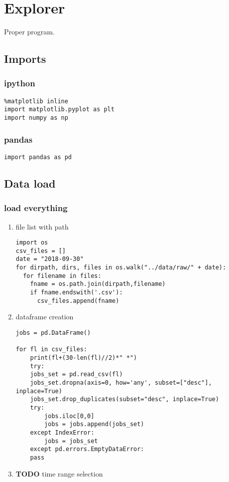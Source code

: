 \documentclass[11pt]{article}
\author{teddd}
\date{\today}
\title{}
\begin{document}
\tableofcontents

\section{Explorer}
\label{sec:org60d7d67}
Proper program.
\subsection{Imports}
\label{sec:org68087d8}
\subsubsection{ipython}
\label{sec:orgb3733d1}
\begin{verbatim}
%matplotlib inline
import matplotlib.pyplot as plt
import numpy as np
\end{verbatim}
\subsubsection{pandas}
\label{sec:orgf814322}
\begin{verbatim}
import pandas as pd    
\end{verbatim}

\subsection{Data load}
\label{sec:org42a236d}
\subsubsection{load everything}
\label{sec:org2d6df79}
\begin{enumerate}
\item file list with path
\label{sec:org4930762}
\begin{verbatim}
import os
csv_files = []
date = "2018-09-30"
for dirpath, dirs, files in os.walk("../data/raw/" + date): 
  for filename in files:
    fname = os.path.join(dirpath,filename)
    if fname.endswith('.csv'):
      csv_files.append(fname)
\end{verbatim}
\item dataframe creation
\label{sec:orgd3123c3}
\begin{verbatim}
jobs = pd.DataFrame()

for fl in csv_files:
    print(fl+(30-len(fl)//2)*" *")
    try:
	jobs_set = pd.read_csv(fl)
	jobs_set.dropna(axis=0, how='any', subset=["desc"], inplace=True)
	jobs_set.drop_duplicates(subset="desc", inplace=True)            
	try:                                                             
	    jobs.iloc[0,0]                                               
	    jobs = jobs.append(jobs_set)                                 
	except IndexError:                                               
	    jobs = jobs_set                                              
    except pd.errors.EmptyDataError:
	pass
\end{verbatim}

\item {\bfseries\sffamily TODO} time range selection
\label{sec:orga67fd7a}
\end{enumerate}
\end{document}
